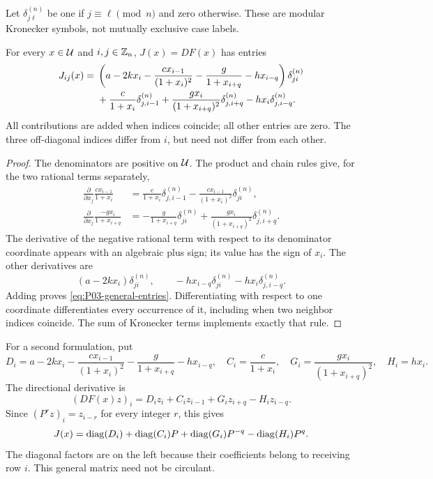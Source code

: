 Let $\delta^{(n)}_{j\ell}$ be one if $j\equiv\ell\pmod n$ and
zero otherwise. These are modular Kronecker symbols, not mutually
exclusive case labels.

\begin{lemma}
\label{lem:P03-jacobian}
For every $x\in\mathcal{U}$ and $i,j\in\mathbb{Z}_n$, $J(x)=DF(x)$ has entries
\begin{align}
 J_{ij}(x)={}&\left(a-2kx_i-\frac{c x_{i-1}}{(1+x_i)^2}
             -\frac{g}{1+x_{i+q}}-h x_{i-q}\right)
                 \delta^{(n)}_{ji}\notag\\
 &+\frac{c}{1+x_i}\delta^{(n)}_{j,i-1}
   +\frac{g x_i}{(1+x_{i+q})^2}\delta^{(n)}_{j,i+q}
   -h x_i\delta^{(n)}_{j,i-q}.
 \label{eq:P03-general-entries}
\end{align}
All contributions are added when indices coincide; all other entries
are zero. The three off-diagonal indices differ from $i$, but need
not differ from each other.
\end{lemma}
\begin{proof}
The denominators are positive on $\mathcal{U}$. The product and chain
rules give, for the two rational terms separately,
\begin{align*}
 \frac{\partial}{\partial x_j}\frac{c x_{i-1}}{1+x_i}
 &=\frac{c}{1+x_i}\delta^{(n)}_{j,i-1}
   -\frac{c x_{i-1}}{(1+x_i)^2}\delta^{(n)}_{ji},\\
 \frac{\partial}{\partial x_j}\frac{-g x_i}{1+x_{i+q}}
 &=-\frac{g}{1+x_{i+q}}\delta^{(n)}_{ji}
   +\frac{g x_i}{(1+x_{i+q})^2}\delta^{(n)}_{j,i+q}.
\end{align*}
The derivative of the negative rational term with respect to its
denominator coordinate appears with an algebraic plus sign; its value
has the sign of $x_i$. The other derivatives are
\[
 (a-2kx_i)\delta^{(n)}_{ji},\qquad
 -h x_{i-q}\delta^{(n)}_{ji}-h x_i\delta^{(n)}_{j,i-q}.
\]
Adding proves \eqref{eq:P03-general-entries}. Differentiating with
respect to one coordinate differentiates every occurrence of it,
including when two neighbor indices coincide. The sum of Kronecker
terms implements exactly that rule.
\end{proof}

For a second formulation, put
\[
 D_i=a-2kx_i-\frac{c x_{i-1}}{(1+x_i)^2}
            -\frac{g}{1+x_{i+q}}-h x_{i-q},\quad
 C_i=\frac{c}{1+x_i},\quad
 G_i=\frac{g x_i}{(1+x_{i+q})^2},\quad H_i=h x_i.
\]
The directional derivative is
\begin{equation}
 (DF(x)z)_i=D_i z_i+C_i z_{i-1}+G_i z_{i+q}-H_i z_{i-q}.
 \label{eq:P03-directional}
\end{equation}
Since $(P^r z)_i=z_{i-r}$ for every integer $r$, this gives
\begin{equation}
 J(x)=\operatorname{diag}(D_i)+\operatorname{diag}(C_i)P+\operatorname{diag}(G_i)P^{-q}
                           -\operatorname{diag}(H_i)P^q.
 \label{eq:P03-variable-matrix}
\end{equation}
The diagonal factors are on the left because their coefficients
belong to receiving row $i$. This general matrix need not be circulant.

